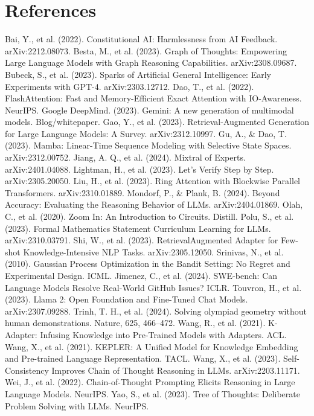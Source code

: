 \documentclass{article}
\begin{document}
\section*{References}
\begin{thebibliography}{99}
Bai, Y., et al. (2022). Constitutional AI: Harmlessness from AI Feedback. arXiv:2212.08073.
Besta, M., et al. (2023). Graph of Thoughts: Empowering Large Language Models with Graph Reasoning Capabilities. arXiv:2308.09687.
Bubeck, S., et al. (2023). Sparks of Artificial General Intelligence: Early Experiments with GPT-4. arXiv:2303.12712.
Dao, T., et al. (2022). FlashAttention: Fast and Memory-Efficient Exact Attention with IO-Awareness. NeurIPS.
Google DeepMind. (2023). Gemini: A new generation of multimodal models. Blog/whitepaper.
Gao, Y., et al. (2023). Retrieval-Augmented Generation for Large Language Models: A Survey. arXiv:2312.10997.
Gu, A., \& Dao, T. (2023). Mamba: Linear-Time Sequence Modeling with Selective State Spaces. arXiv:2312.00752.
Jiang, A. Q., et al. (2024). Mixtral of Experts. arXiv:2401.04088.
Lightman, H., et al. (2023). Let's Verify Step by Step. arXiv:2305.20050.
Liu, H., et al. (2023). Ring Attention with Blockwise Parallel Transformers. arXiv:2310.01889.
Mondorf, P., \& Plank, B. (2024). Beyond Accuracy: Evaluating the Reasoning Behavior of LLMs. arXiv:2404.01869.
Olah, C., et al. (2020). Zoom In: An Introduction to Circuits. Distill.
Polu, S., et al. (2023). Formal Mathematics Statement Curriculum Learning for LLMs. arXiv:2310.03791.
Shi, W., et al. (2023). RetrievalAugmented Adapter for Few-shot Knowledge-Intensive NLP Tasks. arXiv:2305.12050.
Srinivas, N., et al. (2010). Gaussian Process Optimization in the Bandit Setting: No Regret and Experimental Design. ICML.
Jimenez, C., et al. (2024). SWE-bench: Can Language Models Resolve Real-World GitHub Issues? ICLR.
Touvron, H., et al. (2023). Llama 2: Open Foundation and Fine-Tuned Chat Models. arXiv:2307.09288.
Trinh, T. H., et al. (2024). Solving olympiad geometry without human demonstrations. Nature, 625, 466–472.
Wang, R., et al. (2021). K-Adapter: Infusing Knowledge into Pre-Trained Models with Adapters. ACL.
Wang, X., et al. (2021). KEPLER: A Unified Model for Knowledge Embedding and Pre-trained Language Representation. TACL.
Wang, X., et al. (2023). Self-Consistency Improves Chain of Thought Reasoning in LLMs. arXiv:2203.11171.
Wei, J., et al. (2022). Chain-of-Thought Prompting Elicits Reasoning in Large Language Models. NeurIPS.
Yao, S., et al. (2023). Tree of Thoughts: Deliberate Problem Solving with LLMs. NeurIPS.
\end{thebibliography}
\end{document}
